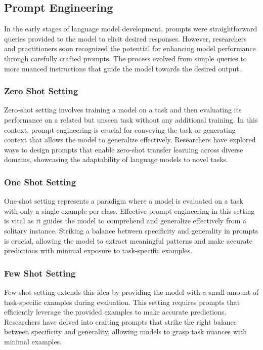 \documentclass[10pt,twocolumn,letterpaper]{article}
\begin{document}
\subsection{Prompt Engineering}
In the early stages of language model development, prompts were straightforward queries provided to the model to elicit desired responses. However, researchers and practitioners soon recognized the potential for enhancing model performance through carefully crafted prompts. The process evolved from simple queries to more nuanced instructions that guide the model towards the desired output.
\subsubsection{Zero Shot Setting}
Zero-shot setting involves training a model on a task and then evaluating its performance on a related but unseen task without any additional training. In this context, prompt engineering is crucial for conveying the task or generating context that allows the model to generalize effectively. Researchers have explored ways to design prompts that enable zero-shot transfer learning across diverse domains, showcasing the adaptability of language models to novel tasks.
\subsubsection{One Shot Setting}
One-shot setting represents a paradigm where a model is evaluated on a task with only a single example per class. Effective prompt engineering in this setting is vital as it guides the model to comprehend and generalize effectively from a solitary instance. Striking a balance between specificity and generality in prompts is crucial, allowing the model to extract meaningful patterns and make accurate predictions with minimal exposure to task-specific examples.
\subsubsection{Few Shot Setting}
Few-shot setting extends this idea by providing the model with a small amount of task-specific examples during evaluation. This setting requires prompts that efficiently leverage the provided examples to make accurate predictions. Researchers have delved into crafting prompts that strike the right balance between specificity and generality, allowing models to grasp task nuances with minimal examples.
\end{document}
